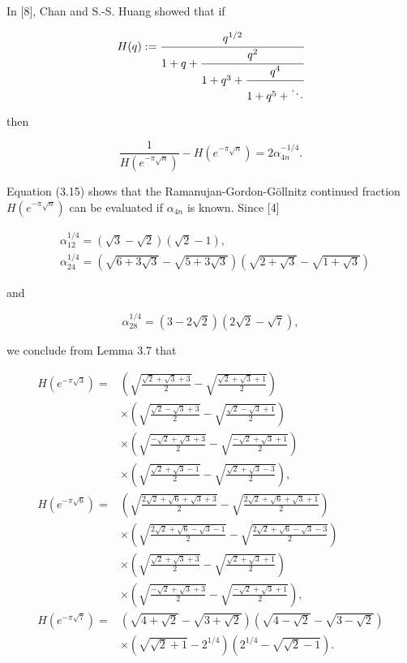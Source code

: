 \documentclass[11pt,letterpaper]{article}
\begin{document}
In [8], Chan and S.-S. Huang showed that if

\[
H(q):=\cfrac{q^{1/2}}{1+q+\cfrac{q^2}{1+q^3+\cfrac{q^4}{1+q^5+\ddots}}}
\]

then


\begin{equation*}
\frac{1}{H\left(e^{-\pi \sqrt{n}}\right)}-H\left(e^{-\pi \sqrt{n}}\right)=2 \alpha_{4 n}^{-1 / 4} . \tag{3.15}\label{eq:3.15}
\end{equation*}


Equation (3.15) shows that the Ramanujan-Gordon-Göllnitz continued fraction $H\left(e^{-\pi \sqrt{n}}\right)$ can be evaluated if $\alpha_{4 n}$ is known. Since [4]

\[
\begin{aligned}
& \alpha_{12}^{1 / 4}=(\sqrt{3}-\sqrt{2})(\sqrt{2}-1), \\
& \alpha_{24}^{1 / 4}=(\sqrt{6+3 \sqrt{3}}-\sqrt{5+3 \sqrt{3}})(\sqrt{2+\sqrt{3}}-\sqrt{1+\sqrt{3}})
\end{aligned}
\]

and

\[
\alpha_{28}^{1 / 4}=(3-2 \sqrt{2})(2 \sqrt{2}-\sqrt{7}),
\]

we conclude from Lemma 3.7 that

\[
\begin{aligned}
H\left(e^{-\pi \sqrt{3}}\right)= & \left(\sqrt{\frac{\sqrt{2}+\sqrt{3}+3}{2}}-\sqrt{\frac{\sqrt{2}+\sqrt{3}+1}{2}}\right) \\
& \times\left(\sqrt{\frac{\sqrt{2}-\sqrt{3}+3}{2}}-\sqrt{\frac{\sqrt{2}-\sqrt{3}+1}{2}}\right) \\
& \times\left(\sqrt{\frac{-\sqrt{2}+\sqrt{3}+3}{2}}-\sqrt{\frac{-\sqrt{2}+\sqrt{3}+1}{2}}\right) \\
& \times\left(\sqrt{\frac{\sqrt{2}+\sqrt{3}-1}{2}}-\sqrt{\frac{\sqrt{2}+\sqrt{3}-3}{2}}\right), \\
H\left(e^{-\pi \sqrt{6}}\right)= & \left(\sqrt{\frac{2 \sqrt{2}+\sqrt{6}+\sqrt{3}+3}{2}}-\sqrt{\frac{2 \sqrt{2}+\sqrt{6}+\sqrt{3}+1}{2}}\right) \\
& \times\left(\sqrt{\frac{2 \sqrt{2}+\sqrt{6}-\sqrt{3}-1}{2}}-\sqrt{\frac{2 \sqrt{2}+\sqrt{6}-\sqrt{3}-3}{2}}\right) \\
& \times\left(\sqrt{\frac{\sqrt{2}+\sqrt{3}+3}{2}}-\sqrt{\frac{\sqrt{2}+\sqrt{3}+1}{2}}\right) \\
& \times\left(\sqrt{\frac{-\sqrt{2}+\sqrt{3}+3}{2}}-\sqrt{\frac{-\sqrt{2}+\sqrt{3}+1}{2}}\right), \\
H\left(e^{-\pi \sqrt{7}}\right)= & (\sqrt{4+\sqrt{2}}-\sqrt{3+\sqrt{2}})(\sqrt{4-\sqrt{2}}-\sqrt{3-\sqrt{2}}) \\
& \times\left(\sqrt{\sqrt{2}+1}-2^{1 / 4}\right)\left(2^{1 / 4}-\sqrt{\sqrt{2}-1}\right) .
\end{aligned}
\]
\end{document}
